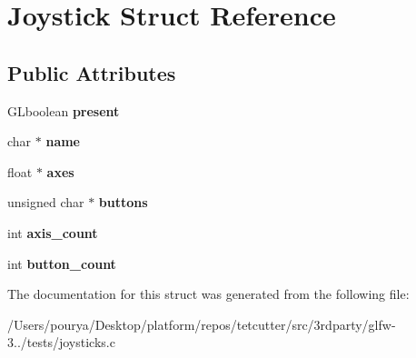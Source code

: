 \hypertarget{structJoystick}{}\section{Joystick Struct Reference}
\label{structJoystick}
\subsection*{Public Attributes}
\begin{DoxyCompactItemize}
\item 
\hypertarget{structJoystick_ad5bfa04930959a574be62e012e547264}{}G\+Lboolean {\bfseries present}\label{structJoystick_ad5bfa04930959a574be62e012e547264}

\item 
\hypertarget{structJoystick_a824bc94fd19822f18df45c136e11b597}{}char $\ast$ {\bfseries name}\label{structJoystick_a824bc94fd19822f18df45c136e11b597}

\item 
\hypertarget{structJoystick_ad6e40c275ecba540f6d898628a53769d}{}float $\ast$ {\bfseries axes}\label{structJoystick_ad6e40c275ecba540f6d898628a53769d}

\item 
\hypertarget{structJoystick_af1a03bc298173215144fc3c450e04122}{}unsigned char $\ast$ {\bfseries buttons}\label{structJoystick_af1a03bc298173215144fc3c450e04122}

\item 
\hypertarget{structJoystick_a2f46d0844fcbfcd38336b167e2e007cd}{}int {\bfseries axis\+\_\+count}\label{structJoystick_a2f46d0844fcbfcd38336b167e2e007cd}

\item 
\hypertarget{structJoystick_a849fd53c1520903b5af41f2733989402}{}int {\bfseries button\+\_\+count}\label{structJoystick_a849fd53c1520903b5af41f2733989402}

\end{DoxyCompactItemize}


The documentation for this struct was generated from the following file\+:\begin{DoxyCompactItemize}
\item 
/\+Users/pourya/\+Desktop/platform/repos/tetcutter/src/3rdparty/glfw-\/3../tests/joysticks.\+c\end{DoxyCompactItemize}
